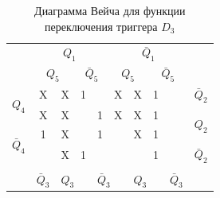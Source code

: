 \documentclass[a4paper,14pt]{article}
\begin{document}
\begin{table}[H]
	\begin{center}
		\caption{\label{tab:D3_tab} Диаграмма Вейча для функции переключения триггера $D_3$ }
		\begin{tabular}{cccccccccc}
			& \multicolumn{4}{c}{$Q_1$} & \multicolumn{4}{c}{$\bar{Q}_1$} &  \\
			& \multicolumn{2}{c}{$Q_5$} & \multicolumn{2}{c}{$\bar{Q}_5$} & \multicolumn{2}{c}{$Q_5$} & \multicolumn{2}{c}{$\bar{Q}_5$} &  \\ \cline{2-9}
			\multicolumn{1}{c|}{\multirow{2}{*}{$Q_4$}} & \multicolumn{1}{c|}{X} & \multicolumn{1}{c|}{X} & \multicolumn{1}{c|}{1} & \multicolumn{1}{c|}{} & \multicolumn{1}{c|}{X} & \multicolumn{1}{c|}{X} & \multicolumn{1}{c|}{1} & \multicolumn{1}{c|}{} & $\bar{Q}_2$ \\ \cline{2-9}
			\multicolumn{1}{c|}{} & \multicolumn{1}{c|}{X} & \multicolumn{1}{c|}{X} & \multicolumn{1}{c|}{} & \multicolumn{1}{c|}{1} & \multicolumn{1}{c|}{X} & \multicolumn{1}{c|}{X} & \multicolumn{1}{c|}{1} & \multicolumn{1}{c|}{} & \multirow{2}{*}{$Q_2$} \\ \cline{2-9}
			\multicolumn{1}{c|}{\multirow{2}{*}{$\bar{Q}_4$}} & \multicolumn{1}{c|}{1} & \multicolumn{1}{c|}{X} & \multicolumn{1}{c|}{} & \multicolumn{1}{c|}{1} & \multicolumn{1}{c|}{} & \multicolumn{1}{c|}{X} & \multicolumn{1}{c|}{1} & \multicolumn{1}{c|}{} &  \\ \cline{2-9}
			\multicolumn{1}{c|}{} & \multicolumn{1}{c|}{} & \multicolumn{1}{c|}{X} & \multicolumn{1}{c|}{1} & \multicolumn{1}{c|}{} & \multicolumn{1}{c|}{} & \multicolumn{1}{c|}{} & \multicolumn{1}{c|}{1} & \multicolumn{1}{c|}{} & $\bar{Q}_2$ \\ \cline{2-9}
			&  & \multicolumn{2}{c}{} & \multicolumn{2}{c}{} & \multicolumn{2}{c}{} &  &  \\
			\multicolumn{1}{l}{} & \multicolumn{1}{l}{$\bar{Q}_3$} & \multicolumn{2}{l}{$Q_3$} & \multicolumn{2}{l}{$\bar{Q}_3$} & \multicolumn{2}{l}{$Q_3$} & \multicolumn{1}{l}{$\bar{Q}_3$} & \multicolumn{1}{l}{}
		\end{tabular}
	\end{center}
\end{table}

\end{document}
